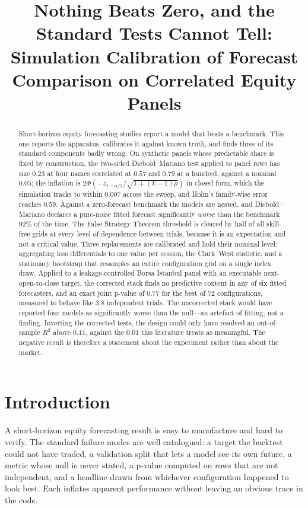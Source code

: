 \documentclass{article}
\title{Nothing Beats Zero, and the Standard Tests Cannot Tell:\\
Simulation Calibration of Forecast Comparison on Correlated Equity Panels}
\theoremstyle{plain}
\theoremstyle{remark}
\begin{document}
\maketitle

\begin{abstract}
Short-horizon equity forecasting studies report a model that beats a benchmark.
This one reports the apparatus, calibrates it against known truth, and finds
three of its standard components badly wrong. On synthetic panels whose
predictable share is fixed by construction, the two-sided Diebold--Mariano test
applied to panel rows has size $0.23$ at four names correlated at $0.57$ and
$0.79$ at a hundred, against a nominal $0.05$; the inflation is
$2\Phi(-z_{1-\alpha/2}/\sqrt{1+(k-1)\bar\rho})$ in closed form, which the
simulation tracks to within $0.007$ across the sweep, and Holm's family-wise
error reaches $0.59$. Against a zero-forecast benchmark the models are nested,
and Diebold--Mariano declares a pure-noise fitted forecast significantly
\emph{worse} than the benchmark $92\%$ of the time. The False Strategy Theorem
threshold is cleared by half of all skill-free grids at every level of
dependence between trials, because it is an expectation and not a critical
value. Three replacements are calibrated and hold their nominal level:
aggregating loss differentials to one value per session, the Clark--West
statistic, and a stationary bootstrap that resamples an entire configuration
grid on a single index draw. Applied to a leakage-controlled Borsa Istanbul
panel with an executable next-open-to-close target, the corrected stack finds no
predictive content in any of six fitted forecasters, and an exact joint p-value
of $0.77$ for the best of 72 configurations, measured to behave like $3.8$
independent trials. The uncorrected stack would have reported four models as
significantly worse than the null---an artefact of fitting, not a finding.
Inverting the corrected tests, the design could only have resolved an
out-of-sample $R^2$ above $0.11$, against the $0.01$ this literature treats as
meaningful. The negative result is therefore a statement about the experiment
rather than about the market.
\end{abstract}

\section{Introduction}

A short-horizon equity forecasting result is easy to manufacture and hard to
verify. The standard failure modes are well catalogued: a target the backtest
could not have traded, a validation split that lets a model see its own future,
a metric whose null is never stated, a p-value computed on rows that are not
independent, and a headline drawn from whichever configuration happened to look
best. Each inflates apparent performance without leaving an obvious trace in the
code.
\end{document}
